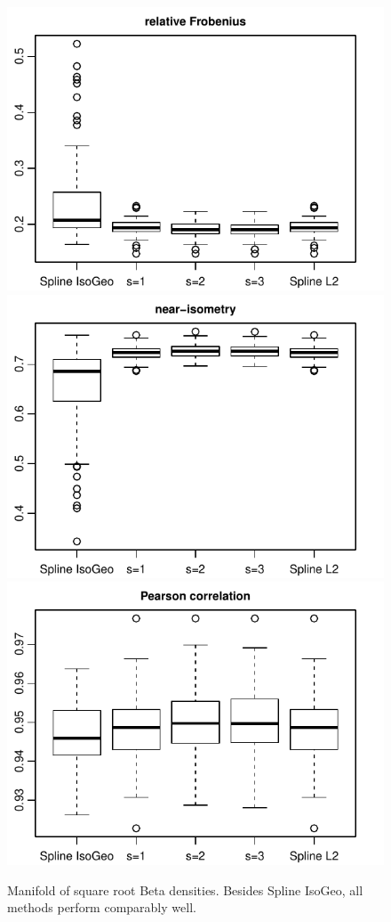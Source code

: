 \documentclass[letterpaper]{article} %
\begin{document}
\begin{figure}
\includegraphics[height=0.3\textheight]{sim_results/sce=4_SNR=high_Kobs=30_MSE}
\includegraphics[height=0.3\textheight]{sim_results/sce=4_SNR=high_Kobs=30_isometry}
\includegraphics[height=0.3\textheight]{sim_results/sce=4_SNR=high_Kobs=30_Pearson}
\caption{Manifold of square root Beta densities. Besides Spline IsoGeo, all methods perform comparably well.}
\label{fig:betas}
\end{figure}




\end{document}
